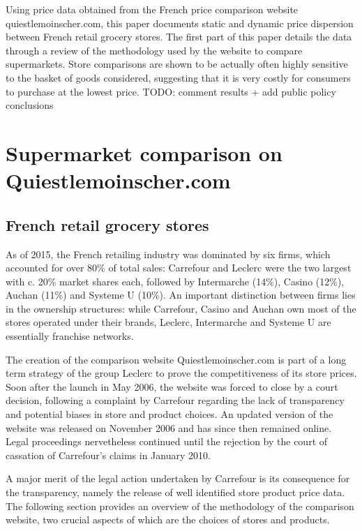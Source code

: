 \documentclass[english]{article}
\begin{document}
Using price data obtained from the French price comparison website quiestlemoinscher.com, this paper documents static and dynamic price dispersion between French retail grocery stores. The first part of this paper details the data through a review of the methodology used by the website to compare supermarkets. Store comparisons are shown to be actually often highly sensitive to the basket of goods considered, suggesting that it is very costly for consumers to purchase at the lowest price. TODO: comment results + add public policy conclusions

\section{Supermarket comparison on Quiestlemoinscher.com}

\subsection{French retail grocery stores}

As of 2015, the French retailing industry was dominated by six firms, which accounted for over 80\% of total sales: Carrefour and Leclerc were the two largest with c. 20\% market shares each, followed by Intermarche (14\%), Casino (12\%), Auchan (11\%) and Systeme U (10\%). An important distinction between firms lies in the ownership structures: while Carrefour, Casino and Auchan own most of the stores operated under their brands, Leclerc, Intermarche and Systeme U are essentially franchise networks.

The creation of the comparison website Quiestlemoinscher.com is part of a long term strategy of the group Leclerc to prove the competitiveness of its store prices. Soon after the launch in May 2006, the website was forced to close by a court decision, following a complaint by Carrefour regarding the lack of transparency and potential biases in store and product choices. An updated version of the website was released on November 2006 and has since then remained online. Legal proceedings nervetheless continued until the rejection by the court of cassation of Carrefour's claims in January 2010.

A major merit of the legal action undertaken by Carrefour is its consequence for the transparency, namely the release of well identified store product price data. The following section provides an overview of the methodology of the comparison website, two crucial aspects of which are the choices of stores and products.
\end{document}
